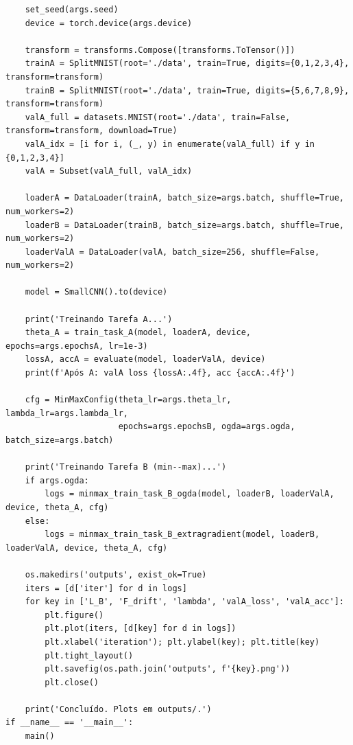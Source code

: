 \documentclass[9pt,a4paper]{extarticle}
\begin{document}
\begin{lstlisting}
    set_seed(args.seed)
    device = torch.device(args.device)

    transform = transforms.Compose([transforms.ToTensor()])
    trainA = SplitMNIST(root='./data', train=True, digits={0,1,2,3,4}, transform=transform)
    trainB = SplitMNIST(root='./data', train=True, digits={5,6,7,8,9}, transform=transform)
    valA_full = datasets.MNIST(root='./data', train=False, transform=transform, download=True)
    valA_idx = [i for i, (_, y) in enumerate(valA_full) if y in {0,1,2,3,4}]
    valA = Subset(valA_full, valA_idx)

    loaderA = DataLoader(trainA, batch_size=args.batch, shuffle=True, num_workers=2)
    loaderB = DataLoader(trainB, batch_size=args.batch, shuffle=True, num_workers=2)
    loaderValA = DataLoader(valA, batch_size=256, shuffle=False, num_workers=2)

    model = SmallCNN().to(device)

    print('Treinando Tarefa A...')
    theta_A = train_task_A(model, loaderA, device, epochs=args.epochsA, lr=1e-3)
    lossA, accA = evaluate(model, loaderValA, device)
    print(f'Após A: valA loss {lossA:.4f}, acc {accA:.4f}')

    cfg = MinMaxConfig(theta_lr=args.theta_lr, lambda_lr=args.lambda_lr,
                       epochs=args.epochsB, ogda=args.ogda, batch_size=args.batch)

    print('Treinando Tarefa B (min--max)...')
    if args.ogda:
        logs = minmax_train_task_B_ogda(model, loaderB, loaderValA, device, theta_A, cfg)
    else:
        logs = minmax_train_task_B_extragradient(model, loaderB, loaderValA, device, theta_A, cfg)

    os.makedirs('outputs', exist_ok=True)
    iters = [d['iter'] for d in logs]
    for key in ['L_B', 'F_drift', 'lambda', 'valA_loss', 'valA_acc']:
        plt.figure()
        plt.plot(iters, [d[key] for d in logs])
        plt.xlabel('iteration'); plt.ylabel(key); plt.title(key)
        plt.tight_layout()
        plt.savefig(os.path.join('outputs', f'{key}.png'))
        plt.close()

    print('Concluído. Plots em outputs/.')
if __name__ == '__main__':
    main()
\end{lstlisting}
\end{document}
